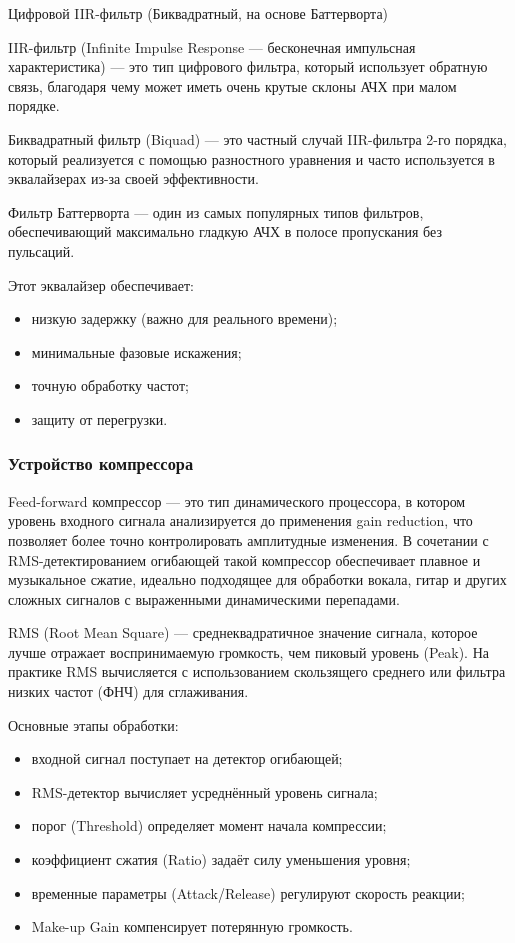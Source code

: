 Цифровой IIR-фильтр (Биквадратный, на основе Баттерворта)

IIR-фильтр (Infinite Impulse Response — бесконечная импульсная характеристика) — это тип цифрового фильтра, который использует обратную связь, благодаря чему может иметь очень крутые склоны АЧХ при малом порядке.

Биквадратный фильтр (Biquad) — это частный случай IIR-фильтра 2-го порядка, который реализуется с помощью разностного уравнения и часто используется в эквалайзерах из-за своей эффективности.

Фильтр Баттерворта — один из самых популярных типов фильтров, обеспечивающий максимально гладкую АЧХ в полосе пропускания без пульсаций.

Этот эквалайзер обеспечивает:
\begin{itemize}
	\item низкую задержку (важно для реального времени);
	\item минимальные фазовые искажения;
	\item точную обработку частот;
	\item защиту от перегрузки.
\end{itemize}

\subsubsection{Устройство компрессора}

Feed-forward компрессор — это тип динамического процессора, в котором уровень входного сигнала анализируется до применения gain reduction, что позволяет более точно контролировать амплитудные изменения. В сочетании с RMS-детектированием огибающей такой компрессор обеспечивает плавное и музыкальное сжатие, идеально подходящее для обработки вокала, гитар и других сложных сигналов с выраженными динамическими перепадами.

RMS (Root Mean Square) — среднеквадратичное значение сигнала, которое лучше отражает воспринимаемую громкость, чем пиковый уровень (Peak). На практике RMS вычисляется с использованием скользящего среднего или фильтра низких частот (ФНЧ) для сглаживания.

Основные этапы обработки:
\begin{itemize}
	\item входной сигнал поступает на детектор огибающей;
	\item RMS-детектор вычисляет усреднённый уровень сигнала;
	\item порог (Threshold) определяет момент начала компрессии;
	\item коэффициент сжатия (Ratio) задаёт силу уменьшения уровня;
	\item временные параметры (Attack/Release) регулируют скорость реакции;
	\item Make-up Gain компенсирует потерянную громкость.
\end{itemize}

